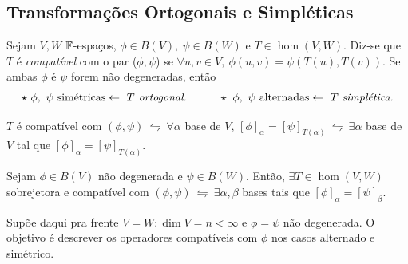 \subsection{Transformações Ortogonais e Simpléticas}

\begin{definition}
    Sejam \(V,W\) \(\mathbb{F}\)-espaços, \(\phi \in B(V), \ \psi \in B(W)\) e \(T\in \hom(V,W)\). Diz-se que \(T\) é \emph{compatível} com o par (\(\phi, \psi\)) se \(\forall u,v \in V, \ \phi(u,v) = \psi(T(u), T(v))\). Se ambas \(\phi \) é \(\psi\) forem não degeneradas, então 
    \[ \star \ \phi, \ \psi \ \text{simétricas} \leftarrow \ T \text{\emph{ ortogonal.}} \hspace{1cm} \star \ \phi, \ \psi \ \text{alternadas} \leftarrow \ T \text{ \emph{simplética.}}\]
\end{definition}

\begin{proposition}
    \(T\) é compatível com \((\phi, \psi)\ \leftrightharpoons \ \forall \alpha\) base de \(V\), \([\phi]_\alpha = [\psi]_{T(\alpha)} \ \leftrightharpoons \ \exists \alpha\) base de \(V\) tal que \( [\phi]_\alpha = [\psi]_{T(\alpha)}\). 
\end{proposition}


\begin{proposition}
    \label{prop:952}
    Sejam \(\phi \in B(V)\) não degenerada e \(\psi \in B(W)\). Então, \(\exists T \in \hom(V,W)\) sobrejetora e compatível com \((\phi, \psi) \ \leftrightharpoons \ \exists \alpha, \beta \) bases tais que \([\phi]_\alpha = [\psi]_\beta\).   
\end{proposition}

\begin{note}
    Supõe daqui pra frente \(V = W: \dim V = n < \infty\) e \(\phi = \psi\) não degenerada. O objetivo  é descrever os operadores compatíveis com \(\phi\) nos casos alternado e simétrico. 
\end{note}

